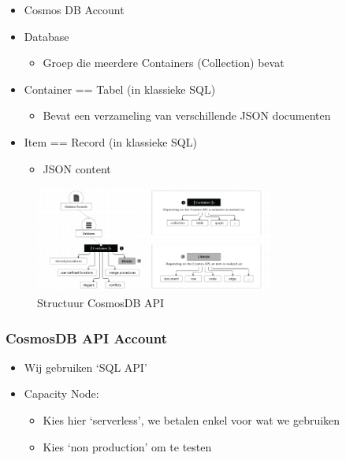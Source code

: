 \documentclass{article}
\begin{document}
\begin{itemize}
    \item Cosmos DB Account
    \item Database
    \begin{itemize}
        \item Groep die meerdere Containers (Collection) bevat
    \end{itemize} 
    \item Container == Tabel (in klassieke SQL)
    \begin{itemize}
        \item Bevat een verzameling van verschillende JSON documenten
    \end{itemize}
    \item Item == Record (in klassieke SQL)
    \begin{itemize}
        \item JSON content
    \end{itemize}
\end{itemize}

\begin{figure}[H]
    \centering
    \includegraphics[width=0.7\textwidth]{cosmosdb-api.png}
    \caption{Structuur CosmosDB API}
\end{figure}

\subsubsection{CosmosDB API Account}

\begin{itemize}
    \item Wij gebruiken `SQL API'
    \item Capacity Node:
    \begin{itemize}
        \item Kies hier `serverless', we betalen enkel voor wat we gebruiken
        \item Kies `non production' om te testen
    \end{itemize}
\end{itemize}
\end{document}
